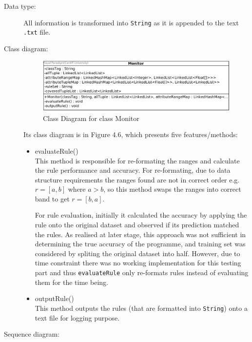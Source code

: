 \begin{description}
\item[Data type: ] All information is transformed into \texttt{String} as it is appended to the text \texttt{.txt} file. 

\item[Class diagram: ] 

\begin{figure}[h]
    \centering
    \includegraphics[width=5in]{figures/class_monitor}
    \caption[Class Diagram for class Monitor]{Class Diagram for class Monitor}
    \label{fig:figure4_6}
\end{figure}

Its class diagram is in Figure 4.6, which presents five features/methods:

\begin{itemize}
	\item{evaluateRule()} \\
	This method is responsible for re-formating the ranges and calculate the rule performance and accuracy. For re-formating, due to data structure requirements the ranges found are not in correct order e.g. $r = [a,b]$ where $a > b$, so this method swaps the ranges into correct band to get $r = [b,a]$.
	 
	For rule evaluation, initially it calculated the accuracy by applying the rule onto the original dataset and observed if its prediction matched the rules. As realised at later stage, this approach was not sufficient in determining the true accuracy of the programme, and training set was considered by spliting the original dataset into half. However, due to time constraint there was no working implementation for this testing part and thus \texttt{evaluateRule} only re-formats rules instead of evaluating them for the time being.
	 
	\item{outputRule()} \\
	This method outputs the rules (that are formatted into \texttt{String}) onto a text file for logging purpose. 
	
\end{itemize}

\item[Sequence diagram: ] 


\end{description}
